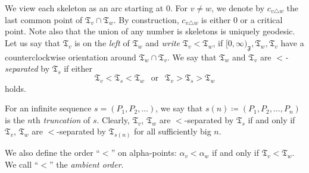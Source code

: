 \documentclass{amsart}
\renewcommand{\sp}{{\ \ }}
\newcommand{\1}{{\mathbb 1 }}
\newcommand\binfty{{\infty}}%
\newcommand{\skel}{{\mathfrak T}}
\newcommand\mF{\mathfrak{F}}
\theoremstyle{remark}
\numberwithin{equation}{section}
\theoremstyle{definition}
\theoremstyle{nonumberbreak}
\begin{document}
We view each skeleton as an arc starting at $0$. For $v\not=w$, we denote by $c_{v\triangle w}$ the last common point of $\skel_v\cap \skel_w$. By construction, $c_{v\triangle w}$ is either $0$ or a critical point. Note also that the union of any number is skeletons is uniquely geodesic. Let us say that $\skel_v$ is on the \emph{left} of $\skel_w$ and \emph{write} $\skel_v< \skel_w$, if $[0,\binfty)_{\mF},\skel_w, \skel_v$ have a counterclockwise orientation around $\skel_w\cap \skel_v$. We say that $\skel_w$ and $ \skel_v$ are \emph{$<$-separated} by $\skel_s$ if either
\[\skel_v<\skel_s <\skel_w \sp \text{ or }\sp \skel_v>\skel_s >\skel_w\]
holds.

For an infinite sequence $s=(P_1,P_2,\dots)$, we say that $s(n)\coloneqq (P_1,P_2,\dots, P_n)$ is the $n$th \emph{truncation} of $s$. Clearly,  $\skel_v$, $\skel_w$ are $<$-separated by $\skel_{s}$ if and only if  $\skel_v$, $\skel_w$ are $<$-separated by $\skel_{s(n)}$ for all sufficiently big $n$. 

We also define the order ``$<$'' on alpha-points: $\alpha_v<\alpha_w$ if and only if $\skel_v<\skel_w$. We call ``$<$'' the \emph{ambient order}.
\end{document}
